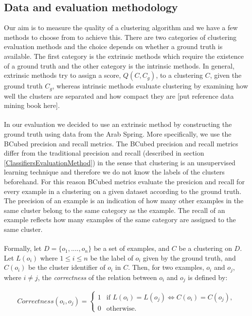    
\subsection{Data and evaluation methodology}\label{ClusteringEvaluationMethod}
Our aim is to measure the quality of a clustering algorithm and we have a few methods to choose from to achieve this. There are two categories of clustering evaluation methods and the choice depends
on whether a ground truth is available. The first category is the extrinsic methods which require the existence of a ground truth and the other category is the intrinsic methods. In general, extrinsic methods try to assign a score, $Q(C, C_g)$, to a clustering $C$, given the ground truth $C_g$, whereas intrinsic methods evaluate clustering by examining how well the clusters are separated and how compact they are [put reference data mining book here].\\\\ 
In our evaluation we decided to use an extrinsic method by constructing the ground truth using data from the Arab Spring. More specifically, we use the BCubed precision and recall metrics. The BCubed precision and recall metrics differ from the traditional precision and recall (described in section \ref{ClassifiersEvaluationMethod}) in the sense that clustering is an unsupervised learning technique and therefore we do not know the labels of the clusters beforehand. For this reason BCubed metrics evaluate the presicion and recall for every example in a clustering on a given dataset according to the ground truth. The precision of an example is an indication of how many other examples in the same cluster belong to the same category as the example. The recall of an example reflects how many examples of the same category are assigned to the same cluster.\\\\ 
Formally, let $D = \{ o_1,....,o_n \}$ be a set of examples, and $C$ be a clustering on $D$. Let $L(o_i)$ where $1 \leq i \leq n$ be the label of $o_i$ given by the ground truth, and $C(o_i)$ be the cluster identifier of $o_i$ in $C$. Then, for two examples, $o_i$ and $o_j$, where $i \neq j$, the \emph{correctness} of the relation between $o_i$ and $o_j$ is defined by:

\begin{eqnarray}
Correctness(o_i, o_j) = \begin{cases}
                          1& \text{if $L(o_i) = L(o_j) \Leftrightarrow C(o_i) = C(o_j) $},\\
                          0& \text{otherwise}.
                        \end{cases}
\end{eqnarray} 

